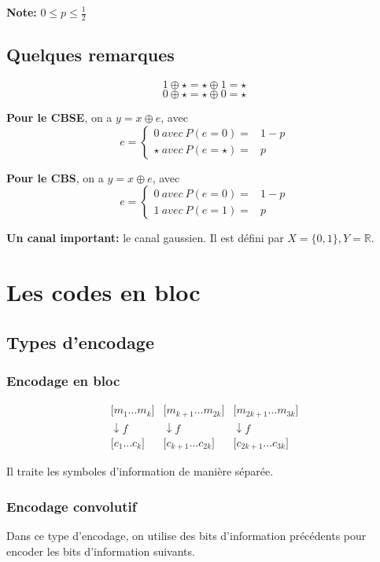 \documentclass[a4paper,10pt,twocolumn]{article}
\theoremstyle{break}
\begin{document}
\textbf{Note:} $0 \le p \le \frac{1}{2}$

\subsection{Quelques remarques}
$$ 1 \oplus \star = \star \oplus 1 = \star$$
$$ 0 \oplus \star = \star \oplus 0 = \star$$

\textbf{Pour le CBSE}, on a
$ y = x \oplus e $, avec
$$ e = \left\lbrace
\begin{array}{cc}
 0 {\ avec\ } P(e=0) = & 1 - p\\
 \star {\ avec\ } P(e=\star) = & p
\end{array}\right.$$

\textbf{Pour le CBS}, on a
$ y = x \oplus e $, avec
$$ e = \left\lbrace
\begin{array}{cc}
 0 {\ avec\ } P(e=0) = & 1 - p\\
 1 {\ avec\ } P(e=1) = & p
\end{array}\right.$$


\textbf{Un canal important:} le canal gaussien. Il est défini par $X = \lbrace 0,1 \rbrace, Y = \mathbb{R}$.


\section{Les codes en bloc}
\subsection{Types d'encodage}
\subsubsection{Encodage en bloc}

$$
\begin{array}{ccc}
 \lbrack m_1 \ldots m_k] & \lbrack m_{k+1} \ldots m_{2k}] & \lbrack m_{2k+1} \ldots m_{3k}]\\
 \downarrow f & \downarrow f & \downarrow f \\
 \lbrack c_1 \ldots c_k] & \lbrack c_{k+1} \ldots c_{2k}] & \lbrack c_{2k+1} \ldots c_{3k}]
\end{array}
$$

Il traite les symboles d'information de manière séparée.

\subsubsection{Encodage convolutif}
Dans ce type d'encodage, on utilise des bits d'information précédents pour encoder les bits d'information suivants.
\end{document}
